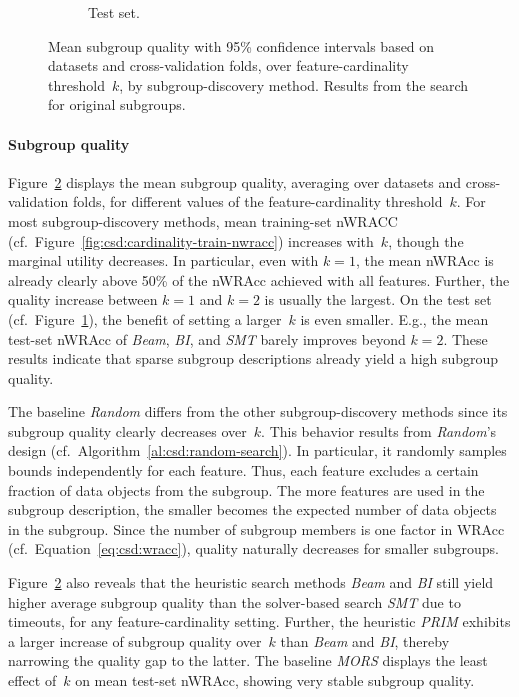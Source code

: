 \documentclass{article}
\theoremstyle{definition}
\begin{document}
\begin{figure}[t]
\begin{subfigure}[t]{0.48\textwidth}
		\caption{Test set.}
		\label{fig:csd:cardinality-test-nwracc}
	\end{subfigure}
	\caption{
		Mean subgroup quality with 95\% confidence intervals based on datasets and cross-validation folds, over feature-cardinality threshold~$k$, by subgroup-discovery method.
		Results from the search for original subgroups.
	}
	\label{fig:csd:cardinality-nwracc}
\end{figure}

\paragraph{Subgroup quality}

Figure~\ref{fig:csd:cardinality-nwracc} displays the mean subgroup quality, averaging over datasets and cross-validation folds, for different values of the feature-cardinality threshold~$k$.
For most subgroup-discovery methods, mean training-set nWRACC (cf.~Figure~\ref{fig:csd:cardinality-train-nwracc}) increases with~$k$, though the marginal utility decreases.
In particular, even with $k=1$, the mean nWRAcc is already clearly above 50\% of the nWRAcc achieved with all features.
Further, the quality increase between $k=1$ and $k=2$ is usually the largest.
On the test set (cf.~Figure~\ref{fig:csd:cardinality-test-nwracc}), the benefit of setting a larger~$k$ is even smaller.
E.g., the mean test-set nWRAcc of \emph{Beam}, \emph{BI}, and \emph{SMT} barely improves beyond $k=2$.
These results indicate that sparse subgroup descriptions already yield a high subgroup quality.

The baseline \emph{Random} differs from the other subgroup-discovery methods since its subgroup quality clearly decreases over~$k$.
This behavior results from \emph{Random}'s design (cf.~Algorithm~\ref{al:csd:random-search}).
In particular, it randomly samples bounds independently for each feature.
Thus, each feature excludes a certain fraction of data objects from the subgroup.
The more features are used in the subgroup description, the smaller becomes the expected number of data objects in the subgroup.
Since the number of subgroup members is one factor in WRAcc (cf.~Equation~\ref{eq:csd:wracc}), quality naturally decreases for smaller subgroups.

Figure~\ref{fig:csd:cardinality-nwracc} also reveals that the heuristic search methods \emph{Beam} and \emph{BI} still yield higher average subgroup quality than the solver-based search \emph{SMT} due to timeouts, for any feature-cardinality setting.
Further, the heuristic \emph{PRIM} exhibits a larger increase of subgroup quality over~$k$ than \emph{Beam} and \emph{BI}, thereby narrowing the quality gap to the latter.
The baseline \emph{MORS} displays the least effect of~$k$ on mean test-set nWRAcc, showing very stable subgroup quality.
\end{document}
